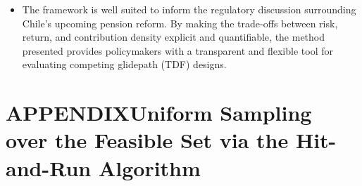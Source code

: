 \documentclass[11pt]{article}
\begin{document}
\begin{itemize}
\item The framework is well suited to inform the regulatory discussion 
surrounding Chile's upcoming pension reform. By making the trade-offs 
between risk, return, and contribution density explicit and 
quantifiable,  the method presented provides policymakers with a transparent and 
flexible tool for evaluating competing glidepath (TDF) designs.  
\end{itemize}




\clearpage
{}
{}
\section*{APPENDIX\quad Uniform Sampling over the Feasible Set via the Hit-and-Run Algorithm}
\label{app:hit-and-run}
\renewcommand{\thesubsection}{\arabic{subsection}}
\renewcommand{\thesubsubsection}{\arabic{subsection}.\arabic{subsubsection}}
\setcounter{subsection}{0}

\end{document}
